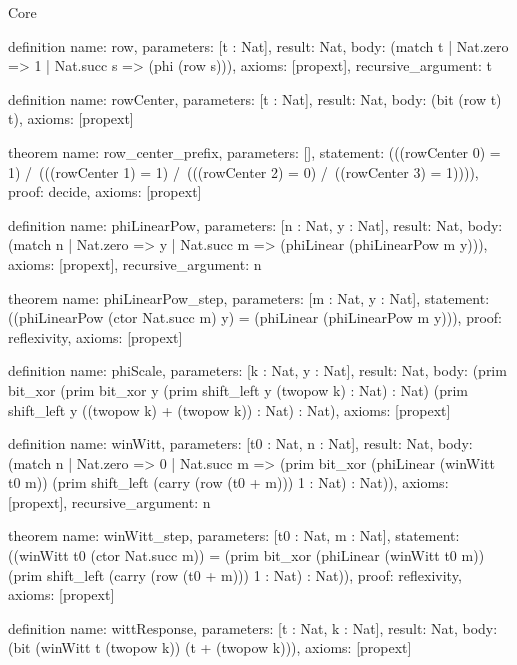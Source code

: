 \begin{lexlean}{Core}
\begin{semanticmodule}
definition{
  name: row,
  parameters: [t : Nat],
  result: Nat,
  body: (match t | Nat.zero => 1 | Nat.succ s => (phi (row s))),
  axioms: [propext],
  recursive_argument: t
}

definition{
  name: rowCenter,
  parameters: [t : Nat],
  result: Nat,
  body: (bit (row t) t),
  axioms: [propext]
}

theorem{
  name: row_center_prefix,
  parameters: [],
  statement: (((rowCenter 0) = 1) /\ (((rowCenter 1) = 1) /\ (((rowCenter 2) = 0) /\ ((rowCenter 3) = 1)))),
  proof: decide{},
  axioms: [propext]
}

definition{
  name: phiLinearPow,
  parameters: [n : Nat, y : Nat],
  result: Nat,
  body: (match n | Nat.zero => y | Nat.succ m => (phiLinear (phiLinearPow m y))),
  axioms: [propext],
  recursive_argument: n
}

theorem{
  name: phiLinearPow_step,
  parameters: [m : Nat, y : Nat],
  statement: ((phiLinearPow (ctor Nat.succ m) y) = (phiLinear (phiLinearPow m y))),
  proof: reflexivity{},
  axioms: [propext]
}

definition{
  name: phiScale,
  parameters: [k : Nat, y : Nat],
  result: Nat,
  body: (prim bit_xor (prim bit_xor y (prim shift_left y (twopow k) : Nat) : Nat) (prim shift_left y ((twopow k) + (twopow k)) : Nat) : Nat),
  axioms: [propext]
}

definition{
  name: winWitt,
  parameters: [t0 : Nat, n : Nat],
  result: Nat,
  body: (match n
    | Nat.zero => 0
    | Nat.succ m => (prim bit_xor (phiLinear (winWitt t0 m)) (prim shift_left (carry (row (t0 + m))) 1 : Nat) : Nat)),
  axioms: [propext],
  recursive_argument: n
}

theorem{
  name: winWitt_step,
  parameters: [t0 : Nat, m : Nat],
  statement: ((winWitt t0 (ctor Nat.succ m)) = (prim bit_xor (phiLinear (winWitt t0 m)) (prim shift_left (carry (row (t0 + m))) 1 : Nat) : Nat)),
  proof: reflexivity{},
  axioms: [propext]
}

definition{
  name: wittResponse,
  parameters: [t : Nat, k : Nat],
  result: Nat,
  body: (bit (winWitt t (twopow k)) (t + (twopow k))),
  axioms: [propext]
}
\end{semanticmodule}
\end{lexlean}
